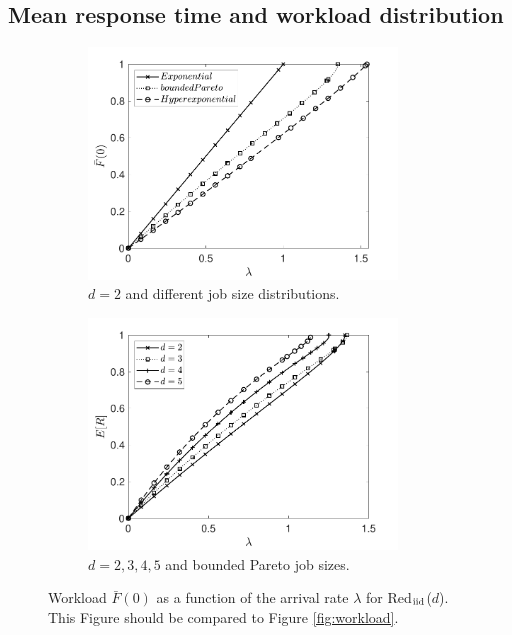 \documentclass[12pt]{report}
\newcommand{\Redind}{Red$_{\textup{iid}}$($d$)}
\begin{document}
\subsection{Mean response time and workload distribution}
\begin{figure}[t]
\begin{subfigure}{.45\textwidth}
\begin{center}
\includegraphics[width=0.9\textwidth]{figures/Chapter3/plot_WL_ifo_lam_diffdists_ind.pdf}
\caption{$d=2$ and different job size distributions.}
\label{fig:workloaddiffjobs_ind}
\end{center}
\end{subfigure}
\begin{subfigure}{.45\textwidth}
\begin{center}
\includegraphics[width=0.9\textwidth]{figures/Chapter3/plot_WL_ifo_lam_diffd_ind.pdf}
\caption{$d=2,3,4,5$ and bounded Pareto job sizes.}
\label{fig:workloaddiffd_ind}
\end{center}
\end{subfigure}
\caption{Workload $\bar{F}(0)$ as a function of the arrival rate $\lambda$ for \Redind . This Figure should be compared to Figure \ref{fig:workload}.}
\label{fig:workload_ind}
\end{figure}
\end{document}
